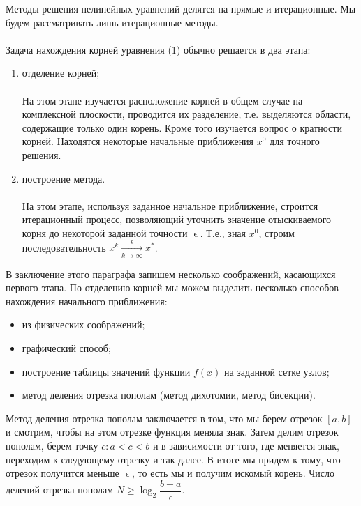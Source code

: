 \documentclass[a4paper, 12pt]{report}
\renewcommand{\geq}{\geqslant}
\renewcommand{\epsilon}{\upvarepsilon}
\begin{document}
	Методы решения нелинейных уравнений делятся на прямые и итерационные. Мы будем рассматривать лишь итерационные методы. \\\\
	Задача нахождения корней уравнения (1) обычно решается в два этапа:
	\begin{enumerate}
		\item отделение корней;\\\\
		На этом этапе изучается расположение корней в общем случае на комплексной плоскости, проводится их разделение, т.е. выделяются области, содержащие только один корень. Кроме того изучается вопрос о кратности корней. Находятся некоторые начальные приближения $x^0$ для точного решения.
		\item построение метода.
		\\\\
		На этом этапе, используя заданное начальное приближение, строится итерационный процесс, позволяющий уточнить значение отыскиваемого корня до некоторой заданной точности $\epsilon$. Т.е., зная $x^0$, строим последовательность $x^k \xrightarrow[k\to\infty]{\epsilon}x^*$.
	\end{enumerate}
	В заключение этого параграфа запишем несколько соображений, касающихся первого этапа. По отделению корней мы можем выделить несколько способов нахождения начального приближения:
	\begin{itemize}
		\item из физических соображений;
		\item графический способ;
		\item построение таблицы значений функции $f(x)$ на заданной сетке узлов;
		\item метод деления отрезка пополам (метод дихотомии, метод бисекции).
	\end{itemize}
	Метод деления отрезка пополам заключается в том, что мы берем отрезок $[a,b]$ и смотрим, чтобы на этом отрезке функция меняла знак. Затем делим отрезок пополам, берем точку $c : a<c<b$ и в зависимости от того, где меняется знак, переходим к следующему отрезку и так далее. В итоге мы придем к тому, что отрезок получится меньше $\epsilon$, то есть мы и получим искомый корень. Число делений отрезка пополам $N \geq \log_2 \dfrac{b-a}{\epsilon}$.
\end{document}
